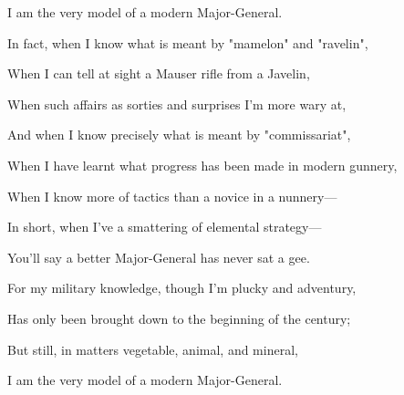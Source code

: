 \documentclass{article}
\begin{document}
    I am the very model of a modern Major-General.


    In fact, when I know what is meant by "mamelon" and "ravelin",

    When I can tell at sight a Mauser rifle from a Javelin,

    When such affairs as sorties and surprises I'm more wary at,

    And when I know precisely what is meant by "commissariat",

    When I have learnt what progress has been made in modern gunnery,

    When I know more of tactics than a novice in a nunnery—

    In short, when I've a smattering of elemental strategy—

    You'll say a better Major-General has never sat a gee.



    For my military knowledge, though I'm plucky and adventury,

    Has only been brought down to the beginning of the century;

    But still, in matters vegetable, animal, and mineral,

    I am the very model of a modern Major-General. 
\end{document}
